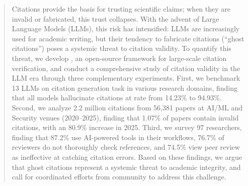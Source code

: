 \begin{abstract}
Citations provide the basis for trusting scientific claims; when they are invalid or fabricated, this trust collapses.
With the advent of Large Language Models (LLMs), this risk has intensified: LLMs are increasingly used for academic writing, but their tendency to fabricate citations (``ghost citations'') poses a systemic threat to citation validity.
To quantify this threat, we develop \citeb, an open-source framework for large-scale citation verification, and conduct a comprehensive study of citation validity in the LLM era through three complementary experiments.
First, we benchmark 13 LLMs on citation generation task in various research domains, finding that all models hallucinate citations at rate from 14.23\% to 94.93\%.
Second, we analyze 2.2 million citations from 56,381 papers at AI/ML and Security venues (2020--2025), finding that 1.07\% of papers contain invalid citations, with an 80.9\% increase in 2025.
Third, we survey 97 researchers, finding that 87.2\% use AI-powered tools in their workflows, 76.7\% of reviewers do not thoroughly check references, and 74.5\% view peer review as ineffective at catching citation errors.
Based on these findings, we argue that ghost citations represent a systemic threat to academic integrity, and call for coordinated efforts from community to address this challenge.
\end{abstract}